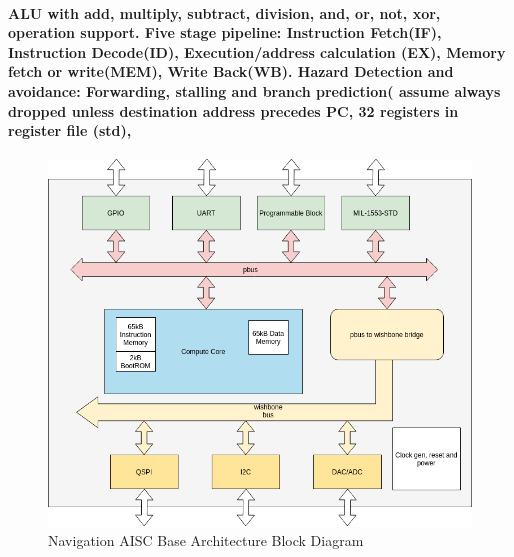 \documentclass[12pt,a4paper]{report}
\begin{document}
\paragraph{\textrm{\textmd{ALU with add, multiply, subtract, division, and, or, not, xor, operation support.
			Five stage pipeline: Instruction Fetch(IF), Instruction Decode(ID), Execution/address calculation (EX), Memory fetch or write(MEM), Write Back(WB).
			Hazard Detection and avoidance: Forwarding, stalling and branch prediction( assume always dropped unless destination address precedes PC,
			32 registers in register file (std),}}}
\begin{figure}[h]
	\centering
	\includegraphics[scale=.35]{nasic2.png}
	\caption{Navigation AISC Base Architecture Block Diagram}
\end{figure}
\end{document}
